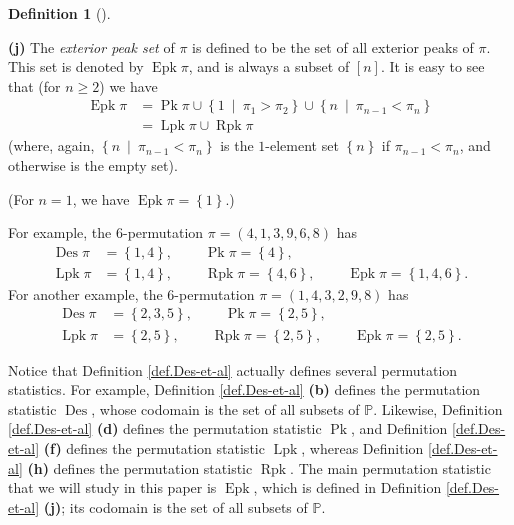 \documentclass[numbers=enddot,12pt,final,onecolumn,notitlepage]{scrartcl}%
\theoremstyle{definition}
\newtheorem{defi}[theo]{Definition}
\newenvironment{definition}[1][]
{\begin{defi}[#1]\begin{leftbar}}
{\end{leftbar}\end{defi}}
\begin{document}
\begin{definition}
\textbf{(j)} The \textit{exterior peak set} of $\pi$ is defined to be the set
of all exterior peaks of $\pi$. This set is denoted by
$\operatorname{Epk} \pi$, and is always a subset of $\left[  n\right]  $.
It is easy to see that (for $n\geq2$) we have
\begin{align*}
\operatorname{Epk}\pi &  =\operatorname*{Pk}\pi\cup\left\{  1\ \mid\ \pi
_{1}>\pi_{2}\right\}  \cup\left\{  n\ \mid\ \pi_{n-1}<\pi_{n}\right\} \\
&  =\operatorname*{Lpk}\pi\cup\operatorname*{Rpk}\pi
\end{align*}
(where, again, $\left\{  n\ \mid\ \pi_{n-1}<\pi_{n}\right\}$ is the
$1$-element set $\left\{n\right\}$ if $\pi_{n-1}<\pi_{n}$,
and otherwise is the empty set).

(For $n=1$, we have $\operatorname{Epk}\pi=\left\{  1\right\}  $.)
\end{definition}

For example, the $6$-permutation $\pi=\left(  4,1,3,9,6,8\right)  $ has%
\begin{align*}
\operatorname{Des}\pi &  =\left\{  1,4\right\}
,\ \ \ \ \ \ \ \ \ \ \operatorname*{Pk}\pi=\left\{  4\right\}  ,\\
\operatorname*{Lpk}\pi &  =\left\{  1,4\right\}
,\ \ \ \ \ \ \ \ \ \ \operatorname*{Rpk}\pi=\left\{  4,6\right\}
,\ \ \ \ \ \ \ \ \ \ \operatorname{Epk}\pi=\left\{  1,4,6\right\}  .
\end{align*}
For another example, the $6$-permutation $\pi=\left(  1,4,3,2,9,8\right)  $
has%
\begin{align*}
\operatorname{Des}\pi &  =\left\{  2,3,5\right\}
,\ \ \ \ \ \ \ \ \ \ \operatorname*{Pk}\pi=\left\{  2,5\right\}  ,\\
\operatorname*{Lpk}\pi &  =\left\{  2,5\right\}
,\ \ \ \ \ \ \ \ \ \ \operatorname*{Rpk}\pi=\left\{  2,5\right\}
,\ \ \ \ \ \ \ \ \ \ \operatorname{Epk}\pi=\left\{  2,5\right\}  .
\end{align*}


Notice that Definition \ref{def.Des-et-al} actually defines several
permutation statistics. For example, Definition \ref{def.Des-et-al}
\textbf{(b)} defines the permutation statistic $\operatorname{Des}$, whose
codomain is the set of all subsets of $\mathbb{P}$. Likewise, Definition
\ref{def.Des-et-al} \textbf{(d)} defines the permutation statistic
$\operatorname*{Pk}$, and Definition \ref{def.Des-et-al} \textbf{(f)} defines
the permutation statistic $\operatorname*{Lpk}$, whereas Definition
\ref{def.Des-et-al} \textbf{(h)} defines the permutation statistic
$\operatorname*{Rpk}$. The main permutation statistic that we will study in
this paper is $\operatorname{Epk}$, which is defined in Definition
\ref{def.Des-et-al} \textbf{(j)}; its codomain is the set of all subsets of
$\mathbb{P}$.
\end{document}
